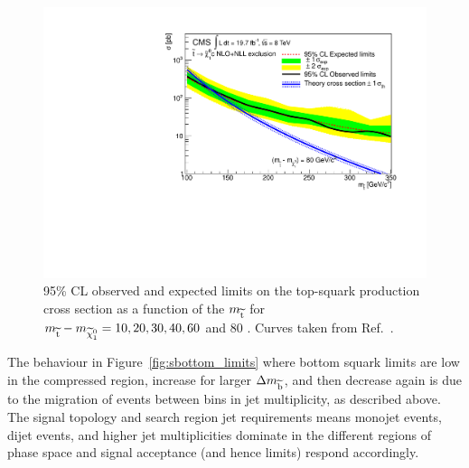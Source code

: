 \begin{figure}[!Hhtb]
\begin{center}
  \includegraphics[scale=0.39]{Figures/sus13009/limits//Limit80.pdf}
  \caption{95\% \ac{CL} observed and expected limits on the top-squark production cross section as a function of the $m_{\widetilde{{\rm t}}}$ for $m_{\widetilde{{\rm t}}} - m_{\widetilde{\chi}^{0}_{1}} = 10, 20, 30, 40, 60$ and 80 \GeV. Curves taken from Ref.~\cite{sus13009}.}
  \label{fig:stop_limits}
  \end{center}
\end{figure}

The behaviour in Figure~\ref{fig:sbottom_limits} where bottom squark limits are low in the compressed region, increase for larger $\Delta m_{\widetilde{{\rm b}}}$, and then decrease again is due to the migration of events between bins in jet multiplicity, as described above. 
The signal topology and search region jet requirements means monojet events, dijet events, and higher jet multiplicities dominate in the different regions of phase space and signal acceptance (and hence limits) respond accordingly. 


